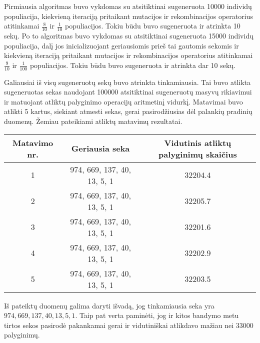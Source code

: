 \documentclass{VUMIFInfKursinis}
\begin{document}
Pirmiausia algoritmas buvo vykdomas su atsitiktinai sugeneruota 10000 individų populiacija, kiekvieną iteraciją pritaikant mutacijos ir rekombinacijos operatorius
atitinkamai $\frac{8}{10}$ ir $\frac{1}{10}$ populiacijos.
Tokiu būdu buvo sugeneruota ir atrinkta 10 sekų.
Po to algoritmas buvo vykdomas su atsitiktinai sugeneruota 15000 individų populiacija, dalį jos inicializuojant geriausiomis prieš tai gautomis sekomis
ir kiekvieną iteraciją pritaikant mutacijos ir rekombinacijos operatorius
atitinkamai $\frac{9}{10}$ ir $\frac{1}{100}$ populiacijos.
Tokiu būdu buvo sugeneruota ir atrinkta dar 10 sekų.

Galiausiai iš visų sugeneruotų sekų buvo atrinkta tinkamiausia.
Tai buvo atlikta sugeneruotas sekas naudojant 100000 atsitiktinai sugeneruotų masyvų rikiavimui
ir matuojant atliktų palyginimo operacijų aritmetinį vidurkį.
Matavimai buvo atlikti 5 kartus, siekiant atmesti sekas, gerai pasirodžiusias dėl palankių pradinių duomenų.
Žemiau pateikiami atliktų matavimų rezultatai.
\begin{center}
  \begin{tabular}{||c c c||} 
  \hline
  Matavimo nr. & Geriausia seka & Vidutinis atliktų palyginimų skaičius \\
  \hline\hline
  1 & 974, 669, 137, 40, 13, 5, 1 & 32204.4 \\ 
  \hline
  2 & 974, 669, 137, 40, 13, 5, 1 & 32205.7 \\
  \hline
  3 & 974, 669, 137, 40, 13, 5, 1 & 32201.6 \\
  \hline
  4 & 974, 669, 137, 40, 13, 5, 1 & 32202.9 \\
  \hline
  5 & 974, 669, 137, 40, 13, 5, 1 & 32203.5 \\
  \hline
 \end{tabular}
 \end{center}
Iš pateiktų duomenų galima daryti išvadą, jog tinkamiausia seka yra $974, 669, 137, 40, 13, 5, 1$.
Taip pat verta paminėti, jog ir kitos bandymo metu tirtos sekos pasirodė pakankamai gerai ir vidutiniškai
atlikdavo mažiau nei $33000$ palyginimų.
\end{document}
